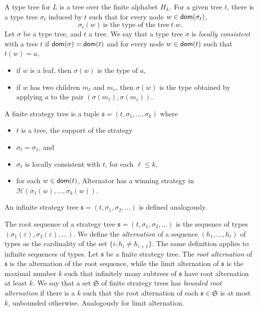 A type tree for $L$ is a tree over the finite alphabet $H_L$. For a given tree $t$, there is a type tree $\sigma_t$ induced by $t$ such that for every node $w \in \mathsf{dom}(\sigma_t)$, 
\begin{equation}
\label{formula:sigmat}
\sigma_t(w)\ \mbox{is the type of the tree}\ t.w.
\end{equation}
Let $\sigma$ be a type tree, and $t$ a tree. We say that a type tree $\sigma$ is \emph{locally consistent} with a tree $t$ if $\mathsf{dom}(\sigma)=\mathsf{dom}(t)$ and for every node $w \in \mathsf{dom}(t)$ such that $t(w)=a$, 
\begin{itemize}
\item if $w$ is a leaf, then $\sigma(w)$ is the type of $a$,
\item if $w$ has two children $m_\ell$ and $m_r$, then $\sigma(w)$ is the type obtained by applying $a$ to the pair $(\sigma(m_\ell), \sigma(m_r))$.
\end{itemize}
\begin{definition} A finite strategy tree is a tuple
$\mathfrak{s}=(t, \sigma_1, \dots, \sigma_k)$ where
\begin{itemize}
\item $t$ is a tree, the support of the strategy
\item $\sigma_t=\sigma_1$, and
\item $\sigma_\ell$ is locally consistent with $t$, for each $\ell \leq k$,
\item for each $w \in \mathsf{dom}(t)$, Alternator has a winning strategy in $\mathcal{H}(\sigma_1(w), \dots, \sigma_k(w))$.
\end{itemize}
An  infinite strategy tree $\mathfrak{s}=(t, \sigma_1, \sigma_2, \dots )$ is defined analogously.
\end{definition}
The root sequence of a strategy tree $\mathfrak{s}=(t, \sigma_1, \sigma_2, \dots )$ is the sequence of types $(\sigma_1(\varepsilon), \sigma_2(\varepsilon), \dots)$.  We define the \emph{alternation} of a sequence $(h_1,\dots,h_\ell)$ of types as the cardinality of the set $\{ i: h_i\neq h_{i+1} \}$. The same definition applies to infinite sequences of types. Let $\mathfrak{s}$ be a finite strategy tree. The \emph{root alternation} of $\mathfrak{s}$ is the alternation of the root sequence, while the limit alternation of $\mathfrak{s}$ is the maximal number $k$ such that infinitely many subtrees of $\mathfrak{s}$ have root alternation at least $k$. We say that a set  $\mathfrak{S}$ of finite strategy trees has \emph{bounded root alternation} if there is a  $k$ such that the root alternation of each $\mathfrak{s} \in \mathfrak{S}$ is at most $k$, unbounded otherwise. Analogously for limit alternation.

